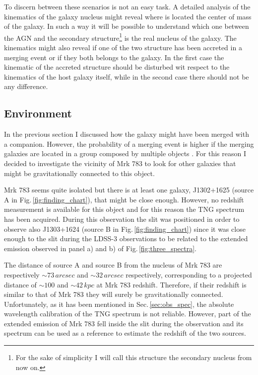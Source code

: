 \documentclass[../thesis.tex]{subfiles}
\begin{document}
To discern between these scenarios is not an easy task.
A detailed analysis of the kinematics of the galaxy nucleus might reveal where is located the center of mass of the galaxy.
In such a way it will be possible to understand which one between the AGN and the secondary structure\footnote{For the sake of simplicity I will call this structure the secondary nucleus from now on.} is the real nucleus of the galaxy.
The kinematics might also reveal if one of the two structure has been accreted in a merging event or if they both belongs to the galaxy.
In the first case the kinematic of the accreted structure should be disturbed wit respect to the kinematics of the host galaxy itself, while in the second case there should not be any difference.

\subsection{Environment}
\label{sec:environment}

In the previous section I discussed how the galaxy might have been merged with a companion.
However, the probability of a merging event is higher if the merging galaxies are located in a group composed by multiple objects \citep{Kampczyk13}.
For this reason I decided to investigate the vicinity of Mrk 783 to look for other galaxies that might be gravitationally connected to this object.

Mrk 783 seems quite isolated but there is at least one galaxy, J1302+1625 (source A in Fig.\,\ref{fig:finding_chart}), that might be close enough. 
However, no redshift measurement is available for this object and for this reason the TNG spectrum has been acquired.
During this observation the slit was positioned in order to observe also J1303+1624 (source B in Fig.\,\ref{fig:finding_chart}) since it was close enough to the slit during the LDSS-3 observations to be related to the extended emission observed in panel a) and b) of Fig.\,\ref{fig:three_spectra}.

The distance of source A and source B from the nucleus of Mrk 783 are respectively $\sim 73\,\si{arcsec}$ and $\sim 32\,\si{arcsec}$ respectively, corresponding to a projected distance of $\sim100$ and $\sim42\,\si{kpc}$ at Mrk 783 redshift.
Therefore, if their redshift is similar to that of Mrk 783 they will surely be gravitationally connected.
Unfortunately, as it has been mentioned in Sec.\,\ref{sec:obs_spec}, the absolute wavelength calibration of the TNG spectrum is not reliable.
However, part of the extended emission of Mrk 783 fell inside the slit during the observation and its spectrum can be used as a reference to estimate the redshift of the two sources.
\end{document}
